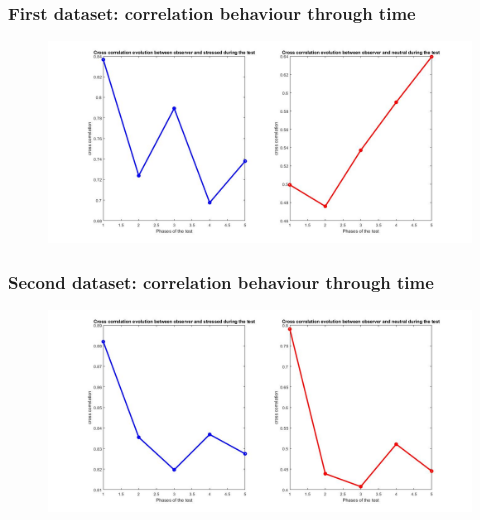 \documentclass{beamer}
\begin{document}
\begin{frame}
\frametitle{First dataset: correlation behaviour through time}


\begin{figure}[H]
	\begin{center}
		\hspace*{-1cm}
		\includegraphics[scale=.28]{corr_time.jpg} 
	\end{center}  
	
	
\end{figure}

\end{frame}

\begin{frame}
\frametitle{Second dataset: correlation behaviour through time}


\begin{figure}[H]
	\begin{center}
		\hspace*{-1cm}
		\includegraphics[scale=.28]{corr_time2.jpg} 
	\end{center}  
	
	
\end{figure}

\end{frame}
\end{document}
